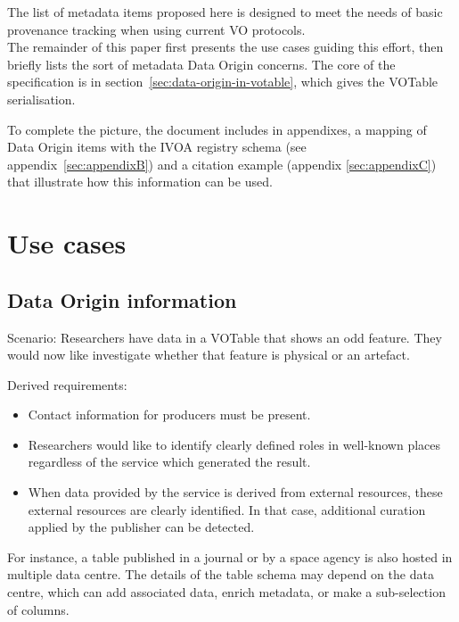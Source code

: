 \documentclass[11pt,a4paper]{ivoa}
\begin{document}
The list of metadata items proposed here is designed to meet the needs of basic provenance
tracking when using current VO protocols.\\


The remainder of this paper first presents the use cases guiding this
effort, then briefly lists the sort of metadata Data Origin concerns.
The core of the specification is in
section~\ref{sec:data-origin-in-votable}, which
gives the VOTable serialisation.

To complete the picture, the document includes in appendixes, a mapping of Data Origin items with the IVOA registry schema (see appendix~\ref{sec:appendixB})
and a citation example (appendix \ref{sec:appendixC}) that illustrate how this information can be used.



\section{Use cases}

\subsection{Data Origin information}

Scenario: Researchers have data in a VOTable that shows an odd feature. They would now like investigate whether that feature is physical or an artefact.

Derived requirements:

\begin{itemize}
\item Contact information for producers must be present.

\item Researchers would like to identify clearly defined roles in well-known places regardless of the service which generated the result.

\item When data provided by the service is derived from external resources, these external resources are clearly identified.  In that case, additional curation applied by the publisher can be detected.
\end{itemize}

For instance, a table published in a journal or by a space agency is also hosted in multiple data centre. The details of the table schema may depend on the data centre, which can add associated data, enrich metadata, or make a sub-selection of columns.
\end{document}

